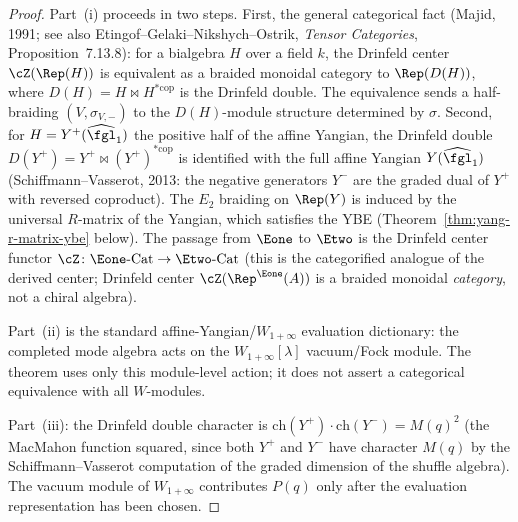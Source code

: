 \begin{proof}
Part~(i) proceeds in two steps. First, the general categorical fact (Majid, 1991; see also Etingof--Gelaki--Nikshych--Ostrik, \emph{Tensor Categories}, Proposition~7.13.8): for a bialgebra $H$ over a field $k$, the Drinfeld center $\cZ(\Rep(H))$ is equivalent as a braided monoidal category to $\Rep(D(H))$, where $D(H) = H \bowtie H^{*\mathrm{cop}}$ is the Drinfeld double. The equivalence sends a half-braiding $(V, \sigma_{V,-})$ to the $D(H)$-module structure determined by $\sigma$. Second, for $H = Y^+(\widehat{\fgl}_1)$ the positive half of the affine Yangian, the Drinfeld double $D(Y^+) = Y^+ \bowtie (Y^+)^{*\mathrm{cop}}$ is identified with the full affine Yangian $Y(\widehat{\fgl}_1)$ (Schiffmann--Vasserot, 2013: the negative generators $Y^-$ are the graded dual of $Y^+$ with reversed coproduct). The $E_2$ braiding on $\Rep(Y)$ is induced by the universal $R$-matrix of the Yangian, which satisfies the YBE (Theorem~\ref{thm:yang-r-matrix-ybe} below). The passage from $\Eone$ to $\Etwo$ is the Drinfeld center functor $\cZ \colon \Eone\text{-}\mathrm{Cat} \to \Etwo\text{-}\mathrm{Cat}$ (this is the categorified analogue of the derived center; Drinfeld center $\cZ(\Rep^{\Eone}(A))$ is a braided monoidal \emph{category}, not a chiral algebra).

Part~(ii) is the standard affine-Yangian/$W_{1+\infty}$ evaluation
dictionary: the completed mode algebra acts on the
$W_{1+\infty}[\lambda]$ vacuum/Fock module. The theorem uses only this
module-level action; it does not assert a categorical equivalence with
all $W$-modules.

Part~(iii): the Drinfeld double character is
\(\mathrm{ch}(Y^+) \cdot \mathrm{ch}(Y^-) = M(q)^2\) (the MacMahon
function squared, since both \(Y^+\) and \(Y^-\) have character \(M(q)\)
by the Schiffmann--Vasserot computation of the graded dimension of the
shuffle algebra).  The vacuum module of \(W_{1+\infty}\) contributes
\(P(q)\) only after the evaluation representation has been chosen.
\end{proof}

